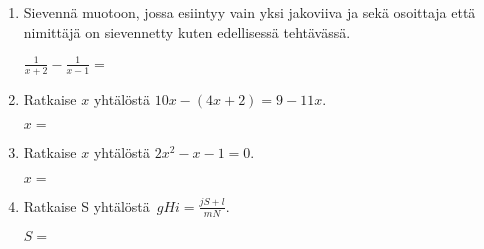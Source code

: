\documentclass[finnish, a4paper, 12pt]{article}
\begin{document}
\begin{enumerate}[leftmargin=*]
		\vspace{8pt}
		
		\item %
		Sievennä %
		muotoon, jossa esiintyy vain yksi jakoviiva ja sekä osoittaja
		että nimittäjä on sievennetty kuten edellisessä tehtävässä.
		
		\(
		\displaystyle
		\frac{1}{x+2}- \frac{1}{x - 1} =
		\) %
		
		\vspace{8pt}
		
		\item %
		Ratkaise \(x\) yhtälöstä \(10x - (4x+2) = 9 - 11x\).
		
		\(
		x = 
		\)	%
		
		\vspace{8pt}
		
		\item %
		Ratkaise \(x\) yhtälöstä \(2 x^2  - x - 1= 0\).
		
		\(
		x = 		
		\)	%
		
		\vspace{8pt}
		
		\item %
		Ratkaise S yhtälöstä 
		\(
		\displaystyle \,
		gHi = \frac{jS+l}{mN} .
		\)	
		
		\(
		S = 
		\) %
		
	\end{enumerate}
	
	
\end{document}
